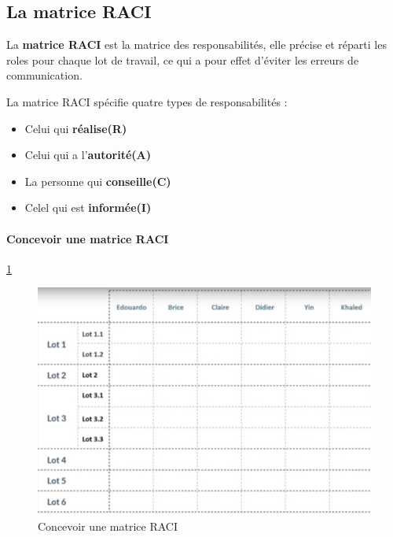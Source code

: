 \subsection{La matrice RACI}
La \textbf{matrice RACI} est la matrice des responsabilités, elle précise et réparti les roles pour chaque lot de travail, ce qui a pour effet d'éviter les erreurs de communication.

La matrice RACI spécifie quatre types de responsabilités : 
\begin{itemize}
	\item Celui qui \textbf{réalise(R)}
	\item Celui qui a l'\textbf{autorité(A)}
	\item La personne qui \textbf{conseille(C)}
	\item Celel qui est \textbf{informée(I)}
\end{itemize}
\paragraph*{Concevoir une matrice RACI}
\ref{fig:concevoir_matrice_raci}	
\begin{figure}[!h]
	\begin{center}
		\includegraphics[scale=0.2]{images/modele_matirce_raci.png}
		\caption{Concevoir une matrice RACI}
		\label{fig:concevoir_matrice_raci}
	\end{center}
\end{figure}
